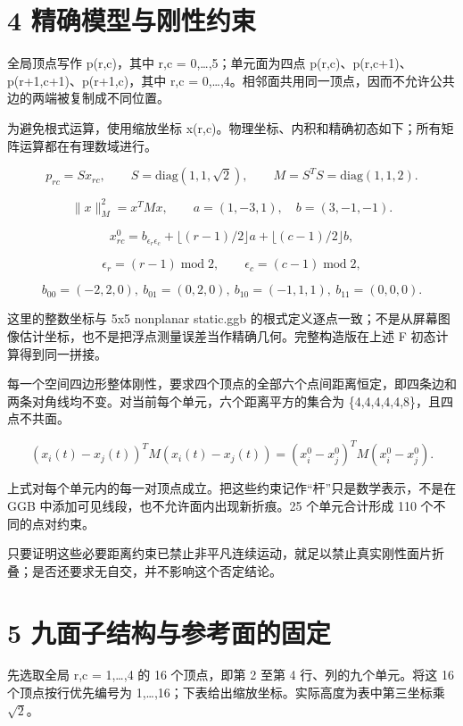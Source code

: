 \documentclass[UTF8,a4paper,11pt]{ctexart}
\begin{document}
\newpage
\section*{4  精确模型与刚性约束}
全局顶点写作 p(r,c)，其中 r,c = 0,…,5；单元面为四点 p(r,c)、p(r,c+1)、p(r+1,c+1)、p(r+1,c)，其中 r,c = 0,…,4。相邻面共用同一顶点，因而不允许公共边的两端被复制成不同位置。

为避免根式运算，使用缩放坐标 x(r,c)。物理坐标、内积和精确初态如下；所有矩阵运算都在有理数域进行。


\[
p_{rc}=Sx_{rc},\qquad S=\mathrm{diag}(1,1,\sqrt{2}),\qquad M=S^TS=\mathrm{diag}(1,1,2).
\]


\[
\|x\|_M^2=x^TMx,\qquad a=(1,-3,1),\quad b=(3,-1,-1).
\]


\[
x^0_{rc}=b_{\epsilon_r\epsilon_c}+\lfloor(r-1)/2\rfloor a+\lfloor(c-1)/2\rfloor b,
\]


\[
\epsilon_r=(r-1)\;\mathrm{mod}\;2,\qquad \epsilon_c=(c-1)\;\mathrm{mod}\;2,
\]


\[
b_{00}=(-2,2,0),\ b_{01}=(0,2,0),\ b_{10}=(-1,1,1),\ b_{11}=(0,0,0).
\]

这里的整数坐标与 5x5 nonplanar static.ggb 的根式定义逐点一致；不是从屏幕图像估计坐标，也不是把浮点测量误差当作精确几何。完整构造版在上述 F 初态计算得到同一拼接。

每一个空间四边形整体刚性，要求四个顶点的全部六个点间距离恒定，即四条边和两条对角线均不变。对当前每个单元，六个距离平方的集合为 \{4,4,4,4,4,8\}，且四点不共面。


\[
(x_i(t)-x_j(t))^TM(x_i(t)-x_j(t))=(x_i^0-x_j^0)^TM(x_i^0-x_j^0).
\]

上式对每个单元内的每一对顶点成立。把这些约束记作“杆”只是数学表示，不是在 GGB 中添加可见线段，也不允许面内出现新折痕。25 个单元合计形成 110 个不同的点对约束。

只要证明这些必要距离约束已禁止非平凡连续运动，就足以禁止真实刚性面片折叠；是否还要求无自交，并不影响这个否定结论。

\newpage
\section*{5  九面子结构与参考面的固定}
先选取全局 r,c = 1,…,4 的 16 个顶点，即第 2 至第 4 行、列的九个单元。将这 16 个顶点按行优先编号为 1,…,16；下表给出缩放坐标。实际高度为表中第三坐标乘 \(\sqrt{2}\)。
\end{document}
